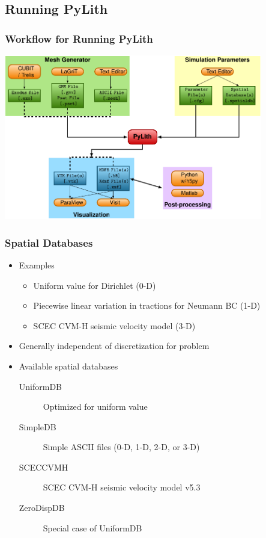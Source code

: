 \documentclass{beamer}
\begin{document}
\subsection{Running PyLith}

\begin{frame}
  \frametitle{Workflow for Running PyLith}

  \begin{center}
    \includegraphics[height=7.2cm]{figs/runpylith}
  \end{center}
   
\end{frame}


\begin{frame}
  \frametitle{Spatial Databases}

  \begin{itemize}
 \item Examples
    \begin{itemize}
    \item Uniform value for Dirichlet (0-D)
    \item Piecewise linear variation in tractions for Neumann BC (1-D)
    \item SCEC CVM-H seismic velocity model (3-D)
    \end{itemize}
  \item Generally independent of discretization for problem
  \item Available spatial databases
    \begin{description}
    \item[UniformDB] Optimized for uniform value
    \item[SimpleDB] Simple ASCII files (0-D, 1-D, 2-D, or 3-D)
    \item[SCECCVMH] SCEC CVM-H seismic velocity model v5.3
    \item[ZeroDispDB] Special case of UniformDB
    \end{description}
 \end{itemize}

\end{frame}
\end{document}

